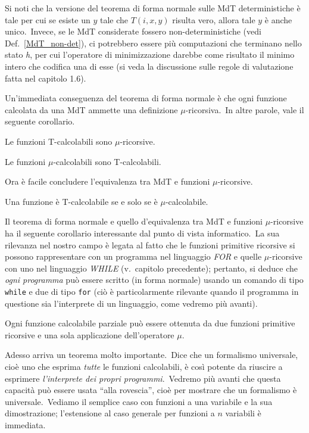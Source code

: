 \noindent Si noti che la versione del teorema di forma normale sulle MdT deterministiche è tale per cui se esiste un $y$ tale che $T(i, x, y)$ risulta vero, allora tale $y$ è anche unico.\
Invece, se le MdT considerate fossero non-deterministiche (vedi Def.\ \ref{MdT_non-det}), ci potrebbero essere più computazioni che terminano nello stato \textit{h}, per cui l'operatore di minimizzazione darebbe come risultato il minimo intero che codifica una di esse (si veda la discussione sulle regole di valutazione fatta nel capitolo 1.6).\

Un'immediata conseguenza del teorema di forma normale è che ogni funzione calcolata da una MdT ammette una definizione $\mu$-ricorsiva.\
In altre parole, vale il seguente corollario.

\begin{corollario}
    Le funzioni T-calcolabili sono $\mu$-ricorsive.
\end{corollario}

\begin{lemma}
    Le funzioni $\mu$-calcolabili sono T-calcolabili.
\end{lemma}

\noindent Ora è facile concludere l'equivalenza tra MdT e funzioni $\mu$-ricorsive.\
\begin{theorem}
    Una funzione è T-calcolabile se e solo se è $\mu$-calcolabile.\
\end{theorem}

\noindent Il teorema di forma normale e quello d'equivalenza tra MdT e funzioni $\mu$-ricorsive ha il seguente corollario interessante dal punto di vista informatico.\
La sua rilevanza nel nostro campo è legata al fatto che le funzioni primitive ricorsive si possono rappresentare con un programma nel linguaggio \textit{\footnotesize FOR} e quelle $\mu$-ricorsive con uno nel linguaggio \textit{\footnotesize WHILE} (v.\ capitolo precedente); pertanto, si deduce che \textit{ogni programma} può essere scritto (in forma normale) usando un comando di tipo \texttt{while} e due di tipo \texttt{for} (ciò è particolarmente rilevante quando il programma in questione sia l'interprete di un linguaggio, come vedremo più avanti).

\begin{corollario}
    Ogni funzione calcolabile parziale può essere ottenuta da due funzioni primitive ricorsive e una sola applicazione dell'operatore $\mu$.
\end{corollario}

\noindent Adesso arriva un teorema molto importante.\
Dice che un formalismo universale, cioè uno che esprima \textit{tutte} le funzioni calcolabili, è così potente da riuscire a esprimere \textit{l'interprete dei propri programmi}.\
Vedremo più avanti che questa capacità può essere usata ``alla rovescia'', cioè per mostrare che un formalismo è universale.\
Vediamo il semplice caso con funzioni a una variabile e la sua dimostrazione; l'estensione al caso generale per funzioni a $n$ variabili è immediata.\

